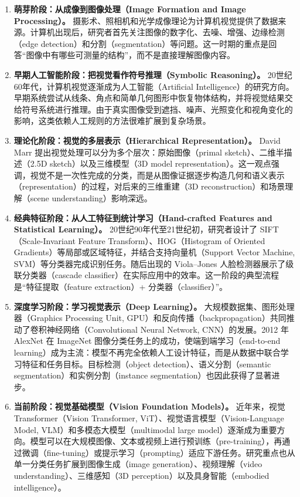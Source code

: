 \documentclass{ctexart}
\begin{document}
\begin{enumerate}[label=\arabic*.]
    \item \textbf{萌芽阶段：从成像到图像处理（Image Formation and Image Processing）。}
    摄影术、照相机和光学成像理论为计算机视觉提供了数据来源。计算机出现后，研究者首先关注图像的数字化、去噪、增强、边缘检测（edge detection）和分割（segmentation）等问题。这一时期的重点是回答“图像中有哪些可测量的结构”，而不是直接理解图像内容。

    \item \textbf{早期人工智能阶段：把视觉看作符号推理（Symbolic Reasoning）。}
    20世纪60年代，计算机视觉逐渐成为人工智能（Artificial Intelligence）的研究方向。早期系统尝试从线条、角点和简单几何图形中恢复物体结构，并将视觉结果交给符号系统进行推理。由于真实图像受到遮挡、噪声、光照变化和视角变化的影响，这类依赖人工规则的方法很难扩展到复杂场景。

    \item \textbf{理论化阶段：视觉的多层表示（Hierarchical Representation）。}
    David Marr 提出视觉处理可以分为多个层次：原始图像（primal sketch）、二维半描述（2.5D sketch）以及三维模型（3D model representation）。这一观点强调，视觉不是一次性完成的分类，而是从图像证据逐步构造几何和语义表示（representation）的过程，对后来的三维重建（3D reconstruction）和场景理解（scene understanding）影响深远。

    \item \textbf{经典特征阶段：从人工特征到统计学习（Hand-crafted Features and Statistical Learning）。}
    20世纪90年代至21世纪初，研究者设计了 SIFT（Scale-Invariant Feature Transform）、HOG（Histogram of Oriented Gradients）等局部或区域特征，并结合支持向量机（Support Vector Machine, SVM）等分类器完成识别任务。随后出现的 Viola--Jones 人脸检测器展示了级联分类器（cascade classifier）在实际应用中的效率。这一阶段的典型流程是“特征提取（feature extraction）+ 分类器（classifier）”。

    \item \textbf{深度学习阶段：学习视觉表示（Deep Learning）。}
    大规模数据集、图形处理器（Graphics Processing Unit, GPU）和反向传播（backpropagation）共同推动了卷积神经网络（Convolutional Neural Network, CNN）的发展。2012 年 AlexNet 在 ImageNet 图像分类任务上的成功，使端到端学习（end-to-end learning）成为主流：模型不再完全依赖人工设计特征，而是从数据中联合学习特征和任务目标。目标检测（object detection）、语义分割（semantic segmentation）和实例分割（instance segmentation）也因此获得了显著进步。

    \item \textbf{当前阶段：视觉基础模型（Vision Foundation Models）。}
    近年来，视觉 Transformer（Vision Transformer, ViT）、视觉语言模型（Vision-Language Model, VLM）和多模态大模型（multimodal large model）逐渐成为重要方向。模型可以在大规模图像、文本或视频上进行预训练（pre-training），再通过微调（fine-tuning）或提示学习（prompting）适应下游任务。研究重点也从单一分类任务扩展到图像生成（image generation）、视频理解（video understanding）、三维感知（3D perception）以及具身智能（embodied intelligence）。
\end{enumerate}
\end{document}
